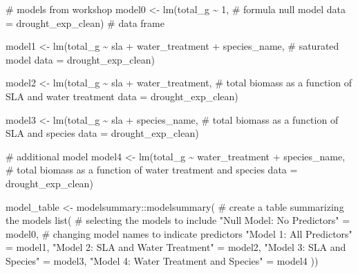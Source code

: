 \documentclass[
  letterpaper,
  DIV=11,
  numbers=noendperiod]{scrartcl}
\newenvironment{Shaded}{\begin{snugshade}}{\end{snugshade}}
\newcommand{\AttributeTok}[1]{\textcolor[rgb]{0.40,0.45,0.13}{#1}}
\newcommand{\CommentTok}[1]{\textcolor[rgb]{0.37,0.37,0.37}{#1}}
\newcommand{\DecValTok}[1]{\textcolor[rgb]{0.68,0.00,0.00}{#1}}
\newcommand{\FunctionTok}[1]{\textcolor[rgb]{0.28,0.35,0.67}{#1}}
\newcommand{\NormalTok}[1]{\textcolor[rgb]{0.00,0.23,0.31}{#1}}
\newcommand{\OtherTok}[1]{\textcolor[rgb]{0.00,0.23,0.31}{#1}}
\newcommand{\SpecialCharTok}[1]{\textcolor[rgb]{0.37,0.37,0.37}{#1}}
\newcommand{\StringTok}[1]{\textcolor[rgb]{0.13,0.47,0.30}{#1}}
\begin{document}
\begin{Shaded}
\begin{Highlighting}[]
\CommentTok{\# models from workshop }
\NormalTok{model0 }\OtherTok{\textless{}{-}} \FunctionTok{lm}\NormalTok{(total\_g }\SpecialCharTok{\textasciitilde{}} \DecValTok{1}\NormalTok{, }\CommentTok{\# formula null model}
             \AttributeTok{data =}\NormalTok{ drought\_exp\_clean) }\CommentTok{\# data frame}

\NormalTok{model1 }\OtherTok{\textless{}{-}} \FunctionTok{lm}\NormalTok{(total\_g }\SpecialCharTok{\textasciitilde{}}\NormalTok{ sla }\SpecialCharTok{+}\NormalTok{ water\_treatment }\SpecialCharTok{+}\NormalTok{ species\_name, }\CommentTok{\# saturated model}
             \AttributeTok{data =}\NormalTok{ drought\_exp\_clean) }

\NormalTok{model2 }\OtherTok{\textless{}{-}} \FunctionTok{lm}\NormalTok{(total\_g }\SpecialCharTok{\textasciitilde{}}\NormalTok{ sla }\SpecialCharTok{+}\NormalTok{ water\_treatment, }\CommentTok{\# total biomass as a function of SLA and water treatment}
             \AttributeTok{data =}\NormalTok{ drought\_exp\_clean)}

\NormalTok{model3 }\OtherTok{\textless{}{-}} \FunctionTok{lm}\NormalTok{(total\_g }\SpecialCharTok{\textasciitilde{}}\NormalTok{ sla }\SpecialCharTok{+}\NormalTok{ species\_name, }\CommentTok{\# total biomass as a function of SLA and species }
             \AttributeTok{data =}\NormalTok{ drought\_exp\_clean)}

\CommentTok{\# additional model}
\NormalTok{model4 }\OtherTok{\textless{}{-}} \FunctionTok{lm}\NormalTok{(total\_g }\SpecialCharTok{\textasciitilde{}}\NormalTok{ water\_treatment }\SpecialCharTok{+}\NormalTok{ species\_name, }\CommentTok{\# total biomass as a function of water treatment and species}
             \AttributeTok{data =}\NormalTok{ drought\_exp\_clean)}



\NormalTok{ model\_table }\OtherTok{\textless{}{-}}\NormalTok{ modelsummary}\SpecialCharTok{::}\FunctionTok{modelsummary}\NormalTok{( }\CommentTok{\# create a table summarizing the models}
  \FunctionTok{list}\NormalTok{( }\CommentTok{\# selecting the models to include}
    \StringTok{"Null Model: No Predictors"} \OtherTok{=}\NormalTok{ model0, }\CommentTok{\# changing model names to indicate predictors }
    \StringTok{"Model 1: All Predictors"} \OtherTok{=}\NormalTok{ model1,}
    \StringTok{"Model 2: SLA and Water Treatment"} \OtherTok{=}\NormalTok{ model2,}
    \StringTok{"Model 3: SLA and Species"} \OtherTok{=}\NormalTok{ model3,}
    \StringTok{"Model 4: Water Treatment and Species"} \OtherTok{=}\NormalTok{ model4}
\NormalTok{  ))}
\end{Highlighting}
\end{Shaded}
\end{document}
